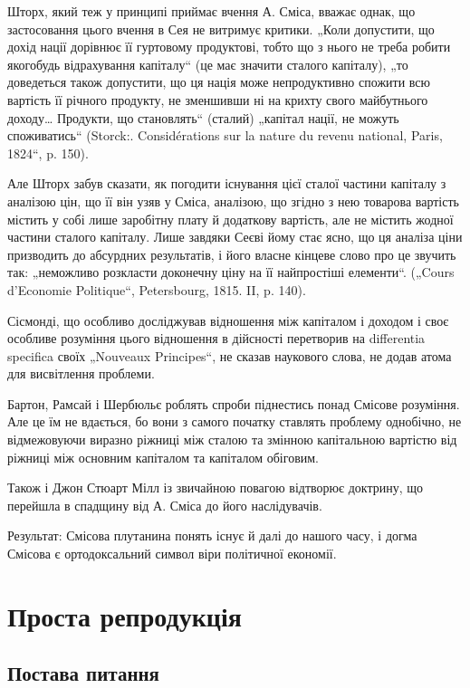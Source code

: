 Шторх, який теж у принципі приймає вчення А. Сміса, вважає однак,
що застосовання цього вчення в Сея не витримує критики. „Коли
допустити, що дохід нації дорівнює її гуртовому продуктові, тобто що з
нього не треба робити якогобудь відрахування капіталу“ (це має значити
сталого капіталу), „то доведеться також допустити, що ця нація може
непродуктивно спожити всю вартість її річного продукту, не зменшивши
ні на крихту свого майбутнього доходу\dots{} Продукти, що становлять“
(сталий) „капітал нації, не можуть споживатись“ (Storck:. Considérations
sur la nature du revenu national, Paris, 1824“, p. 150).

Але Шторх забув сказати, як погодити існування цієї сталої частини
капіталу з аналізою цін, що її він узяв у Сміса, аналізою, що згідно з
нею товарова вартість містить у собі лише заробітну плату й додаткову
вартість, але не містить жодної частини сталого капіталу. Лише завдяки
Сеєві йому стає ясно, що ця аналіза ціни призводить до абсурдних
результатів, і його власне кінцеве слово про це звучить так: „неможливо
розкласти доконечну ціну на її найпростіші елементи“. („Cours d’Economie
Politique“, Petersbourg, 1815. II, p. 140).

Сісмонді, що особливо досліджував відношення між капіталом і доходом
і своє особливе розуміння цього відношення в дійсності перетворив
на differentia specifica своїх „Nouveaux Principes“, не сказав 
наукового слова, не додав  атома для висвітлення проблеми.

Бартон, Рамсай і Шербюльє роблять спроби піднестись понад Смісове
розуміння. Але це їм не вдається, бо вони з самого початку ставлять
проблему однобічно, не відмежовуючи виразно ріжниці між сталою
та змінною капітальною вартістю від ріжниці між основним капіталом та
капіталом обіговим.

Також і Джон Стюарт Мілл із звичайною повагою відтворює доктрину,
що перейшла в спадщину від А. Сміса до його наслідувачів.

Результат: Смісова плутанина понять існує й далі до нашого часу, і
догма Смісова є ортодоксальний символ віри політичної економії.

\section{Проста репродукція}

\subsection{Постава питання}

